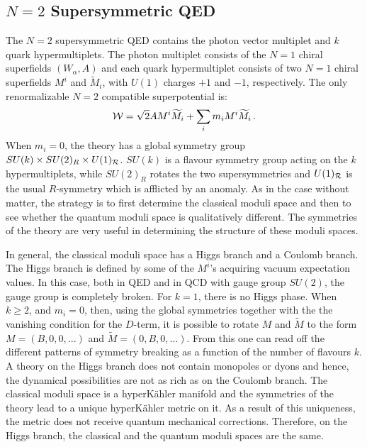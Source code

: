 \subsection{$N = 2$ Supersymmetric QED}

The $N=2$ supersymmetric QED contains the photon vector multiplet and
$k$ quark hypermultiplets. The photon multiplet consists of the $N=1$
chiral superfields $(W_{\alpha}, A)$ and each quark hypermultiplet
consists of two $N=1$ chiral superfields $M^i$ and $\widetilde M_i$,
with $U(1)$ charges $+1$ and $-1$, respectively. The only
renormalizable $N = 2$ compatible superpotential is: 
$$
{\cal W}=\sqrt{2} A M^i\widetilde M_i + \sum_i m_i M^i\widetilde
M_i\,. 
$$
When $m_i = 0$, the theory has a global symmetry group $SU(k)\times
SU(2)_R \times U(1)_{\cal R}$. $SU(k)$ is a flavour symmetry group
acting on the $k$ hypermultiplets, while $SU(2)_R$ rotates the two
supersymmetries and $U(1)_{\cal R}$ is the usual $R$-symmetry which is
afflicted by an anomaly. As in the case without matter, the strategy
is to first determine the classical moduli space and then to
see whether the quantum moduli space is qualitatively different.
The symmetries of the theory are very useful in determining the
structure of these moduli spaces.

In general, the classical moduli space has a Higgs branch and a
Coulomb branch. The Higgs branch is defined by some of the $M^i$'s
acquiring vacuum expectation values. In this case, both in QED and in
QCD with gauge group $SU(2)$, the gauge group is completely broken.
For $k=1$, there is no Higgs phase.  When $k \geq 2$, and $m_i = 0$,
then, using the global symmetries together with the the vanishing
condition for the $D$-term, it is possible to rotate $M$ and
$\widetilde M$ to the form $M=(B,0,0,...)$ and $\widetilde M = (0,
B,0,...)$. From this one can read off the different patterns of
symmetry breaking as a function of the number of flavours $k$. A
theory on the Higgs branch does not contain monopoles or dyons and
hence, the dynamical possibilities are not as rich as on the Coulomb
branch. The classical moduli space is a hyperK\"ahler manifold and the
symmetries of the theory lead to a unique hyperK\"ahler metric on
it. As a result of this uniqueness, the metric does not receive
quantum mechanical corrections. Therefore, on the Higgs branch, the
classical and the quantum moduli spaces are the same.

